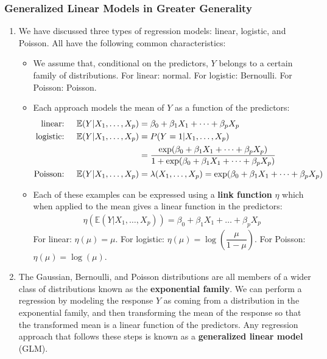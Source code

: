 \documentclass[10pt]{article}
\newcommand{\EE}{{\mathbb{E}}}
\begin{document}
\subsubsection{Generalized Linear Models in Greater Generality}
\begin{enumerate}
	\item We have discussed three types of regression models: linear, logistic, and Poisson.  All have the following common characteristics: \begin{itemize}
		\item We assume that, conditional on the predictors, $Y$ belongs to a certain family of distributions.  For linear: normal.  For logistic: Bernoulli.  For Poisson: Poisson.
		\item Each approach models the mean of $Y$ as a function of the predictors: 
		\begin{align*}
			\text{linear:} \hspace{.2in}   \EE(Y|X_1, \dots, X_p) &= \beta_0 + \beta_1X_1 + \dots + \beta_pX_p \\
			\text{logistic:} \hspace{.2in}   \EE(Y|X_1, \dots, X_p) &= P(Y=1|X_1, \dots, X_p) \\ 
			&= \dfrac{\exp(\beta_0 + \beta_1X_1 + \dots + \beta_pX_p)}{1 + \exp(\beta_0 + \beta_1X_1 + \dots + \beta_pX_p)} \\
			\text{Poisson:} \hspace{.2in}    \EE(Y|X_1, \dots, X_p) &= \lambda(X_1, \dots, X_p) = \exp(\beta_0 + \beta_1X_1 + \dots + \beta_pX_p)
		\end{align*}
		\item Each of these examples can be expressed using a \textbf{link function} $\eta$ which when applied to the mean gives a linear function in the predictors:
		\begin{align*}
			\eta(\EE(Y|X_1, \dots, X_p)) = \beta_0 + \beta_1X_1 + \dots + \beta_pX_p
		\end{align*}
		For linear: $\eta(\mu) = \mu$.  For logistic: $\eta(\mu) = \log\left(\dfrac{\mu}{1 - \mu}\right)$.  For Poisson: $\eta(\mu) = \log(\mu)$.
	\end{itemize}
	\item The Gaussian, Bernoulli, and Poisson distributions are all members of a wider class of distributions known as the \textbf{exponential family}.  We can perform a regression by modeling the response $Y$ as coming from a distribution in the exponential family, and then transforming the mean of the response so that the transformed mean is a linear function of the predictors.  Any regression approach that follows these steps is known as a \textbf{generalized linear model} (GLM).  
\end{enumerate}
\end{document}
